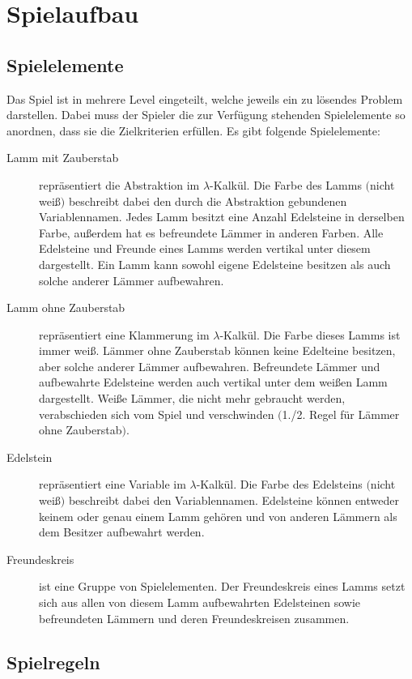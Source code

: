 \section{Spielaufbau}

\subsection{Spielelemente}

Das Spiel ist in mehrere Level eingeteilt, welche jeweils ein zu lösendes Problem darstellen. Dabei muss der Spieler die zur Verfügung stehenden Spielelemente so anordnen, dass sie die Zielkriterien erfüllen. Es gibt folgende Spielelemente:

\begin{description}
\item[Lamm mit Zauberstab] repräsentiert die Abstraktion im $\lambda$-Kalkül. Die Farbe des Lamms $($nicht weiß$)$ beschreibt dabei den durch die Abstraktion gebundenen Variablennamen. Jedes Lamm besitzt eine Anzahl Edelsteine in derselben Farbe, außerdem hat es befreundete Lämmer in anderen Farben. Alle Edelsteine und Freunde eines Lamms werden vertikal unter diesem dargestellt. Ein Lamm kann sowohl eigene Edelsteine besitzen als auch solche anderer Lämmer aufbewahren.
\item[Lamm ohne Zauberstab] repräsentiert eine Klammerung im $\lambda$-Kalkül. Die Farbe dieses Lamms ist immer weiß. Lämmer ohne Zauberstab können keine Edelteine besitzen, aber solche anderer Lämmer aufbewahren. Befreundete Lämmer und aufbewahrte Edelsteine werden auch vertikal unter dem weißen Lamm dargestellt. Weiße Lämmer, die nicht mehr gebraucht werden, verabschieden sich vom Spiel und verschwinden $($1./2. Regel für Lämmer ohne Zauberstab$)$.
\item[Edelstein] repräsentiert eine Variable im $\lambda$-Kalkül. Die Farbe des Edelsteins $($nicht weiß$)$ beschreibt dabei den Variablennamen. Edelsteine können entweder keinem oder genau einem Lamm gehören und von anderen Lämmern als dem Besitzer aufbewahrt werden.
\item[Freundeskreis] ist eine Gruppe von Spielelementen. Der Freundeskreis eines Lamms setzt sich aus allen von diesem Lamm aufbewahrten Edelsteinen sowie befreundeten Lämmern und deren Freundeskreisen zusammen.
\end{description}

\subsection{Spielregeln}

